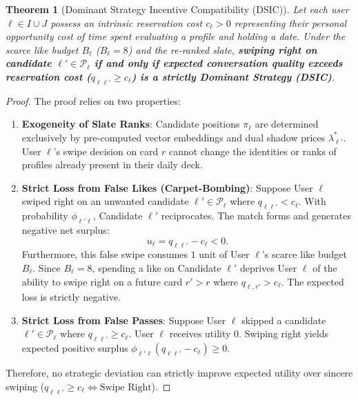\documentclass[11pt,letterpaper]{article}
\theoremstyle{definition}
\theoremstyle{plain}
\newtheorem{theorem}{Theorem}[section]
\theoremstyle{remark}
\begin{document}
\begin{theorem}[Dominant Strategy Incentive Compatibility (DSIC)]
\label{thm:dsic}
Let each user $\ell \in I \cup J$ possess an intrinsic reservation cost $c_\ell > 0$ representing their personal opportunity cost of time spent evaluating a profile and holding a date. Under the scarce like budget $B_\ell$ ($B_\ell = 8$) and the re-ranked slate, \textbf{swiping right on candidate $\ell' \in \mathcal{P}_\ell$ if and only if expected conversation quality exceeds reservation cost ($q_{\ell\ell'} \ge c_\ell$) is a strictly Dominant Strategy (DSIC)}.
\end{theorem}

\begin{proof}
The proof relies on two properties:
\begin{enumerate}[leftmargin=2em]
    \item \textbf{Exogeneity of Slate Ranks}: Candidate positions $\pi_\ell$ are determined exclusively by pre-computed vector embeddings and dual shadow prices $\lambda_{\ell'}^*$. User $\ell$'s swipe decision on card $r$ cannot change the identities or ranks of profiles already present in their daily deck.
    \item \textbf{Strict Loss from False Likes (Carpet-Bombing)}:
    Suppose User $\ell$ swiped right on an unwanted candidate $\ell' \in \mathcal{P}_\ell$ where $q_{\ell\ell'} < c_\ell$.
    With probability $\phi_{\ell'\ell}$, Candidate $\ell'$ reciprocates. The match forms and generates negative net surplus:
    \[
        u_\ell = q_{\ell\ell'} - c_\ell < 0.
    \]
    Furthermore, this false swipe consumes $1$ unit of User $\ell$'s scarce like budget $B_\ell$. Since $B_\ell = 8$, spending a like on Candidate $\ell'$ deprives User $\ell$ of the ability to swipe right on a future card $r' > r$ where $q_{\ell, r'} > c_\ell$. The expected loss is strictly negative.
    \item \textbf{Strict Loss from False Passes}:
    Suppose User $\ell$ skipped a candidate $\ell' \in \mathcal{P}_\ell$ where $q_{\ell\ell'} \ge c_\ell$. 
    User $\ell$ receives utility $0$. Swiping right yields expected positive surplus $\phi_{\ell'\ell}(q_{\ell\ell'} - c_\ell) \ge 0$.
\end{enumerate}
Therefore, no strategic deviation can strictly improve expected utility over sincere swiping ($q_{\ell\ell'} \ge c_\ell \iff \text{Swipe Right}$).
\end{proof}

\newpage
\end{document}
